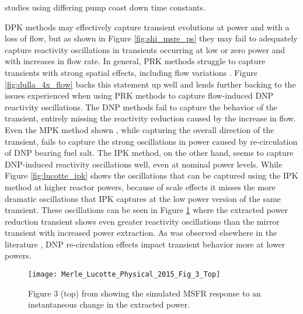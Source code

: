\documentclass[review]{elsarticle}
\begin{document}
studies using differing pump coast down time constants.
\par DPK methods may effectively capture transient evolutions at power and
 with a loss
of flow, but as shown in Figure \ref{fig:shi_msre_ps} they may fail to
adequately capture reactivity oscillations in transients occurring at low
or zero power
and with increases in flow rate. In general, PRK methods struggle to capture
transients with strong spatial effects, including flow variations 
\cite{dulla_models_2005}. Figure \ref{fig:dulla_4x_flow} backs this statement
up well and lends further backing to the issues experienced when using
 PRK methods 
to capture flow-induced DNP reactivity oscillations. The DNP methods fail
to capture the behavior of the transient, entirely missing the reactivity
reduction caused by the increase in flow. Even the MPK method shown
\cite{dulla_models_2005}, while capturing the overall direction of the
transient, fails to capture the strong oscillations in power caused by
re-circulation of DNP bearing fuel salt. The IPK method, on the other hand,
seems to capture DNP-induced reactivity oscillations well, even at nominal
power levels. While Figure \ref{fig:lucotte_ipk} shows the oscillations that
can be captured using the
IPK method at higher reactor powers, because of scale effects
it misses the more dramatic oscillations that IPK captures at the low power
version of the same transient. These oscillations can be seen in Figure
\ref{fig:lucotte_ipk_reac} where the extracted power reduction transient shows
even greater reactivity oscillations than the mirror transient with increased
power extraction. As was observed elsewhere in the literature 
\cite{zanetti_development_2016}, DNP re-circulation effects impact
transient behavior more at lower powers.

\begin{figure}[H]
   \centering
   \texttt{[image: Merle\_Lucotte\_Physical\_2015\_Fig\_3\_Top]}
   \caption{Figure 3 (top) from \cite{merle-lucotte_physical_2015} showing the simulated
   MSFR response to an instantaneous change in the extracted power.} 
   \label{fig:lucotte_ipk_reac}
\end{figure}
\end{document}
